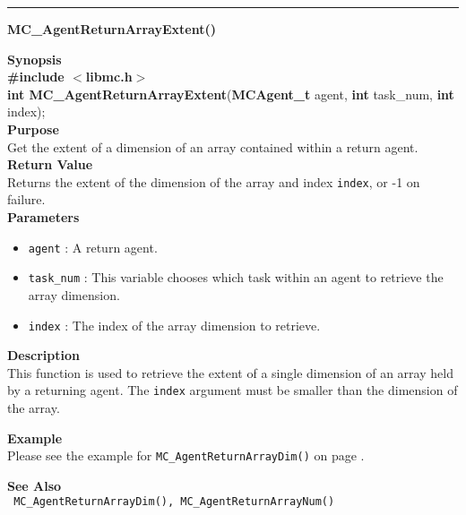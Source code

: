 \noindent
\vspace{5pt}
\rule{6.5in}{0.015in}
\noindent
{}
{\LARGE \bf MC\_AgentReturnArrayExtent()}\\
\label{api:MC_AgentReturnArrayExtent()}

\noindent
{\bf Synopsis}\\
{\bf \#include $<$libmc.h$>$}\\
{\bf int MC\_AgentReturnArrayExtent}({\bf MCAgent\_t} agent, {\bf int} task\_num, {\bf int} index);\\

\noindent
{\bf Purpose}\\
Get the extent of a dimension of an array contained within a return agent.\\

\noindent
{\bf Return Value}\\
Returns the extent of the dimension of the array and index \texttt{index}, or
-1 on failure.\\

\noindent
{\bf Parameters}
\begin{itemize}
\item \texttt{agent} : A return agent.
\item \texttt{task\_num} : This variable chooses which task within an agent to
retrieve the array dimension.
\item \texttt{index} : The index of the array dimension to retrieve.
\end{itemize}


\noindent
{\bf Description}\\
This function is used to retrieve the extent of a single dimension of an array
held by a returning agent. The \texttt{index} argument must be smaller than the
dimension of the array.

\noindent
{\bf Example}\\
\noindent
Please see the example for \texttt{MC\_AgentReturnArrayDim()} on page \pageref{api:MC_AgentReturnArrayDim()}.

\noindent
{\bf See Also}\\
\texttt{
  MC\_AgentReturnArrayDim(), MC\_AgentReturnArrayNum()
}

